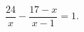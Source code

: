 \begin{ex}[type=equation]
	\begin{condition}
		$\dfrac{24}{x} - \dfrac{17 - x}{x - 1} = 1.$
	\end{condition}
\end{ex}